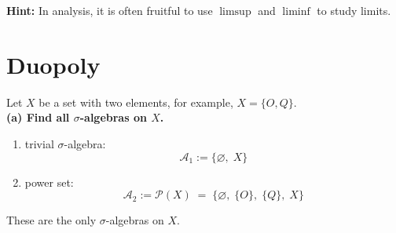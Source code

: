 \documentclass[lang=cn,11pt]{elegantbook}
\begin{document}
\noindent \textbf{Hint:} In analysis, it is often fruitful to use \(\limsup\) and \(\liminf\) to study limits.\\

\section{Duopoly}
\noindent Let \(X\) be a set with two elements, for example, \(X = \{O, Q\}\).\\
\noindent \textbf{(a) Find all \(\sigma\)-algebras on \(X\).}
\begin{solution}
    \begin{enumerate}
    \item trivial \(\sigma\)-algebra:\[
     \mathcal{A}_1 :=\{\varnothing,\; X\}
   \]
   \item power set:
   \[
     \mathcal{A}_2 := \mathcal{P}(X)
     \;=\;\{\varnothing,\;\{O\},\;\{Q\},\;X\}
   \]
\end{enumerate}
These are the only $\sigma$-algebras on $X$.\\\\
\end{solution}
\end{document}
